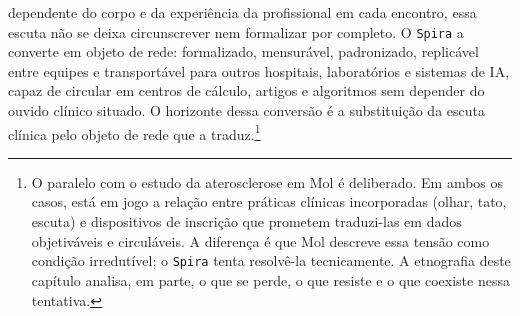 dependente do corpo e da experiência da profissional em cada encontro, essa escuta não se deixa circunscrever nem formalizar por completo. O \texttt{Spira} a converte em objeto de rede: formalizado, mensurável, padronizado, replicável entre equipes e transportável para outros hospitais, laboratórios e sistemas de IA, capaz de circular em centros de cálculo, artigos e algoritmos sem depender do ouvido clínico situado. O horizonte dessa conversão é a substituição da escuta clínica pelo objeto de rede que a traduz.\footnote{O paralelo com o estudo da aterosclerose em Mol é deliberado. Em ambos os casos, está em jogo a relação entre práticas clínicas incorporadas (olhar, tato, escuta) e dispositivos de inscrição que prometem traduzi-las em dados objetiváveis e circuláveis. A diferença é que Mol descreve essa tensão como condição irredutível; o \texttt{Spira} tenta resolvê-la tecnicamente. A etnografia deste capítulo analisa, em parte, o que se perde, o que resiste e o que coexiste nessa tentativa.}

